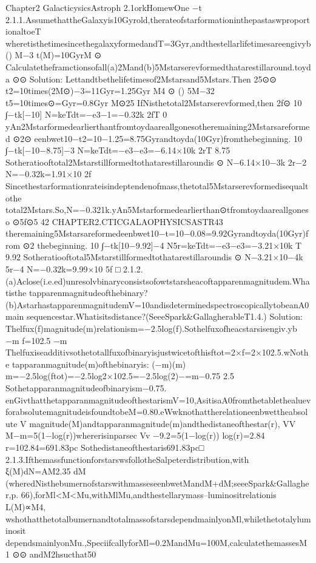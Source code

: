 Chapter2
GalacticysicsAstroph
2.1orkHomewOne
−t
2.1.1.AssumethattheGalaxyis10Gyrold,therateofstarformationinthepastaswproportionaltoeT
wheretisthetimesincethegalaxyformedandT=3Gyr,andthestellarlifetimesareengivyb
()
M−3
t(M)=10GyrM
⊙
Calculatetheframctionsofall(a)2Mand(b)5Mstarserevformedthatarestillaround.toyda
⊙⊙
Solution:
Lettandtbethelifetimesof2Mstarsand5Mstars.Then
25⊙⊙
t2=10times(2M⊙)−3=11Gyr=1.25Gyr
M4
⊙
()
5M−32
t5=10times⊙=Gyr=0.8Gyr
M⊙25
IfNisthetotal2Mstarserevformed,then
2f⊙
10
∫−tk[−10]
N=keTdt=−e3−1=−0.32k
2fT
0
yAn2Mstarformedearlierthantfromtoydaareallgonesotheremaining2Mstarsareformed
⊙2⊙
eenbwet10−t2=10−1.25=8.75Gyrandtoyda(10Gyr)fromthebeginning.
10
∫−tk[−10−8.75]−3
N=keTdt=−e3−e3=−6.14×10k
2rT
8.75
Sotheratiooftotal2Mstarstillformedtothatarestillaroundis
⊙
N−6.14×10−3k
2r−2
N=−0.32k=1.91×10
2f
Sincethestarformationrateisindeptendenofmass,thetotal5Mstarserevformedisequaltothe
total2Mstars.So,N=−0.321k.yAn5Mstarformedearlierthan⊙tfromtoydaareallgoneso
⊙5f⊙5
42
CHAPTER2.CTICGALAOPHYSICSASTR43
theremaining5Mstarsareformedeenbwet10−t=10−0.08=9.92Gyrandtoyda(10Gyr)from
⊙2
thebeginning.
10
∫−tk[10−9.92]−4
N5r=keTdt=−e3−e3=−3.21×10k
T
9.92
Sotheratiooftotal5Mstarstillformedtothatarestillaroundis
⊙
N−3.21×10−4k
5r−4
N=−0.32k=9.99×10
5f
□
2.1.2.(a)Aclose(i.e.ed)unresolvbinaryconsistsofowtstarsheacoftapparenmagnitudem.Whatisthe
tapparenmagnitudeofthebinary?
(b)AstarhastapparenmagnitudemV=10andisdeterminedspectroscopicallytobeanA0main
sequencestar.Whatisitsdistance?(SeeeSpark&GallagherableT1.4.)
Solution:
Thelfux(f)magnitude(m)relationism=−2.5log(f).Sothelfuxofheacstarsisengiv.yb
−m
f=102.5
−m
Thelfuxiseadditivsothetotallfuxofbinaryisjustwicetofthisftot=2×f=2×102.5.wNothe
tapparanmagnitude(m)ofthebinaryis:
(−m)(m)
m=−2.5log(ftot)=−2.5log2×102.5=−2.5log(2)−=m−0.75
2.5
Sothetapparanmagnitudeofbinaryism−0.75.
enGivthatthetapparanmagnitudeofthestarismV=10,AsitisaA0fromthetablethealuev
forabsolutemagnitudeisfoundtobeM=0.80.eWwknothattherelationeenbwettheabsolute
V
magnitude(M)andtapparanmagnitude(m)andthedistaneofthestar(r),
VV
M−m=5(1−log(r))whererisinparsec
Vv
−9.2=5(1−log(r))
log(r)=2.84
r=102.84=691.83pc
Sothedistaneofthestaris691.83pc□
2.1.3.IfthemassfunctionforstarswsfollotheSalpeterdistribution,with
ξ(M)dN=AM2.35
dM
(wheredNisthebumernofstarswithmasseseenbwetMandM+dM;seeeSpark&Gallagher,p.
66),forMl<M<Mu,withMlMu,andthestellarymass–luminositrelationis
L(M)∝M4,
wshothatthetotalbumernandtotalmassofstarsdependmainlyonMl,whilethetotalyluminosit
dependsmainlyonMu.,SpeciifcallyforMl=0.2MandMu=100M,calculatethemassesM1
⊙⊙
andM2hsucthat50%
